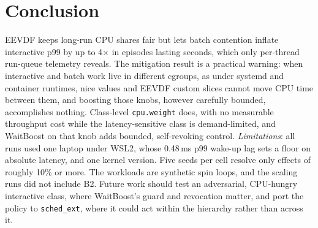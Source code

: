 \documentclass[conference]{IEEEtran}
\newcommand{\ms}{\,ms}
\newcommand{\cpuweight}{\texttt{cpu.weight}}
\begin{document}
\section{Conclusion}
EEVDF keeps long-run CPU shares fair but lets batch contention inflate interactive p99 by up to 4$\times$ in episodes lasting seconds, which only per-thread run-queue telemetry reveals. The mitigation result is a practical warning: when interactive and batch work live in different cgroups, as under systemd and container runtimes, nice values and EEVDF custom slices cannot move CPU time between them, and boosting those knobs, however carefully bounded, accomplishes nothing. Class-level \cpuweight{} does, with no measurable throughput cost while the latency-sensitive class is demand-limited, and WaitBoost on that knob adds bounded, self-revoking control. \textit{Limitations}: all runs used one laptop under WSL2, whose 0.48\ms{} p99 wake-up lag sets a floor on absolute latency, and one kernel version. Five seeds per cell resolve only effects of roughly 10\% or more. The workloads are synthetic spin loops, and the scaling runs did not include B2. Future work should test an adversarial, CPU-hungry interactive class, where WaitBoost's guard and revocation matter, and port the policy to \texttt{sched\_ext}, where it could act within the hierarchy rather than across it.



\end{document}
